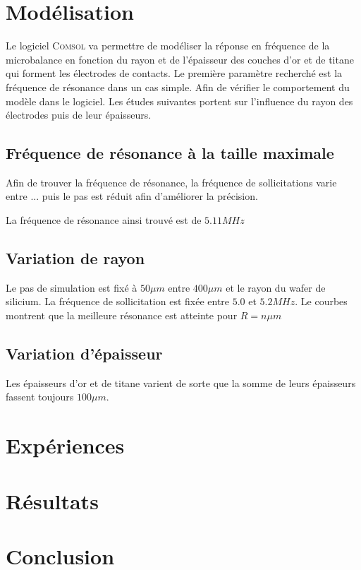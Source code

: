 \documentclass[a4paper,10pt]{article}
\begin{document}
\section{Modélisation}

Le logiciel \textsc{Comsol} va permettre de modéliser la réponse en fréquence de la microbalance en fonction du rayon et de l'épaisseur des couches d'or et de titane qui forment les électrodes de contacts.
Le première paramètre recherché est la fréquence de résonance dans un cas simple. Afin de vérifier le comportement du modèle dans le logiciel. Les études suivantes portent sur l'influence du rayon des électrodes puis de leur épaisseurs.
\subsection{Fréquence de résonance à la taille maximale}
Afin de trouver la fréquence de résonance, la fréquence de sollicitations varie entre ... puis le pas est réduit afin d'améliorer la précision.

La fréquence de résonance ainsi trouvé est de $5.11 MHz$
\subsection{Variation de rayon}

Le pas de simulation est fixé à $50 \mu m$ entre $400 \mu m$ et le rayon du wafer de silicium. La fréquence de sollicitation est fixée entre $5.0$ et $5.2 MHz$. %
Le courbes montrent que la meilleure résonance est atteinte pour $R=n \mu m$





\subsection{Variation d'épaisseur}

Les épaisseurs d'or et de titane varient de sorte que la somme de leurs épaisseurs fassent toujours $100 \mu m$.



\section{Expériences}

\section{Résultats}

\section{Conclusion}
\end{document}
